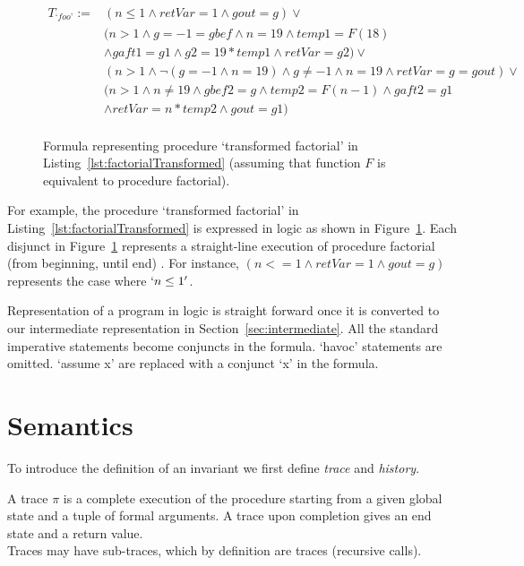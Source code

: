 \documentclass{llncs}
\newcommand{\foo}{\textit{`foo'}}
\newcommand{\trace}{\pi}
\newcommand{\pathCondition}{\mathit{T_{\foo}}}
\newcommand{\F}{\mathit{F}}
\begin{document}
\begin{figure}
  \begin{align*}
    \pathCondition :=
    &(n \leq 1 \wedge retVar = 1 \wedge gout = g) \vee \\
    &(n > 1 \wedge g = -1 = gbef \wedge n = 19 \wedge temp1 = \F(18) \\
    \;&\wedge gaft1 = g1 \wedge g2 = 19 * temp1
    \wedge retVar = g2) \vee\\
    &(n > 1 \wedge \neg( g = -1 \wedge n = 19) \wedge g \neq -1
    \wedge n = 19 \wedge retVar = g = gout) \vee\\
    &(n > 1 \wedge n \neq 19 \wedge gbef2 = g \wedge temp2 = \F( n
    - 1) \wedge gaft2 = g1\\
    &\wedge retVar = n * temp2 \wedge gout = g1)\\
  \end{align*}
  \caption{Formula representing procedure `transformed factorial' in
    Listing~\ref{lst:factorialTransformed} (assuming that function
    $\F$ is equivalent to procedure factorial).}
  \label{fig:pathCondition}
\end{figure}

For example, the procedure `transformed factorial' in
Listing~\ref{lst:factorialTransformed} is expressed in logic as shown
in Figure~\ref{fig:pathCondition}. Each disjunct in
Figure~\ref{fig:pathCondition} represents a straight-line execution of
procedure factorial (from beginning, until end) . For instance, $(n <=
1 \wedge retVar = 1 \wedge gout = g)$ represents the case where $`n
\leq 1'$.

Representation of a program in logic is straight forward once it is
converted to our intermediate representation in
Section~\ref{sec:intermediate}. All the standard imperative statements
become conjuncts in the formula. `havoc' statements are omitted.
`assume x' are replaced with a conjunct `x' in the formula.


\section{Semantics}

To introduce the definition of an invariant we first define
\textit{trace} and \textit{history}.

\begin{definition}[trace]
  A trace $\trace$ is a complete execution of the procedure starting
  from a given global state and a tuple of formal arguments. A trace
  upon completion gives an end state and a return value.\\ Traces may
  have sub-traces, which by definition are traces (recursive calls).
\end{definition}
\end{document}

